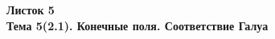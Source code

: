 \documentclass[a4paper, 11pt]{article}
\begin{document}
\begin{center} \Large \bf Листок 5\\ Тема 5(2.1). Конечные поля. Соответствие Галуа \end{center}


\end{document}
